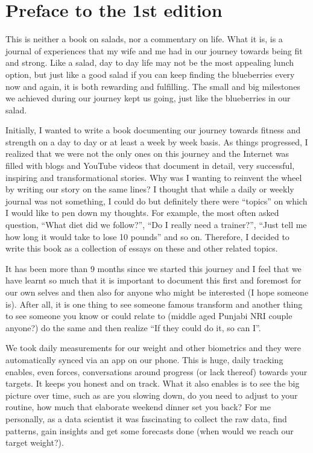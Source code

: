 \documentclass[
  oneside]{book}
\begin{document}
\hypertarget{preface-to-the-1st-edition}{%
\chapter{Preface to the 1st edition}\label{preface-to-the-1st-edition}}

This is neither a book on salads, nor a commentary on life. What it is, is a journal of experiences that my wife and me had in our journey towards being fit and strong. Like a salad, day to day life may not be the most appealing lunch option, but just like a good salad if you can keep finding the blueberries every now and again, it is both rewarding and fulfilling. The small and big milestones we achieved during our journey kept us going, just like the blueberries in our salad.

Initially, I wanted to write a book documenting our journey towards fitness and strength on a day to day or at least a week by week basis. As things progressed, I realized that we were not the only ones on this journey and the Internet was filled with blogs and YouTube videos that document in detail, very successful, inspiring and transformational stories. Why was I wanting to reinvent the wheel by writing our story on the same lines? I thought that while a daily or weekly journal was not something, I could do but definitely there were ``topics'' on which I would like to pen down my thoughts. For example, the most often asked question, ``What diet did we follow?'', ``Do I really need a trainer?'', ``Just tell me how long it would take to lose 10 pounds'' and so on. Therefore, I decided to write this book as a collection of essays on these and other related topics.

It has been more than 9 months since we started this journey and I feel that we have learnt so much that it is important to document this first and foremost for our own selves and then also for anyone who might be interested (I hope someone is). After all, it is one thing to see someone famous transform and another thing to see someone you know or could relate to (middle aged Punjabi NRI couple anyone?) do the same and then realize ``If they could do it, so can I''.

We took daily measurements for our weight and other biometrics and they were automatically synced via an app on our phone. This is huge, daily tracking enables, even forces, conversations around progress (or lack thereof) towards your targets. It keeps you honest and on track. What it also enables is to see the big picture over time, such as are you slowing down, do you need to adjust to your routine, how much that elaborate weekend dinner set you back? For me personally, as a data scientist it was fascinating to collect the raw data, find patterns, gain insights and get some forecasts done (when would we reach our target weight?).
\end{document}
